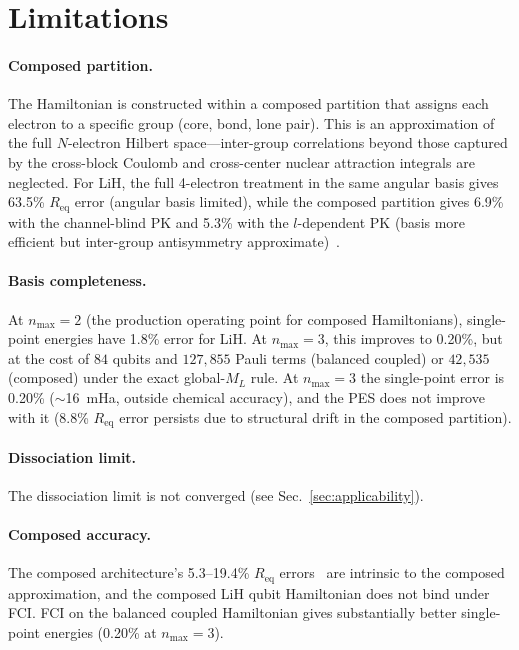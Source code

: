 \documentclass[twocolumn,pra,amsmath,amssymb,superscriptaddress]{revtex4-2}
\begin{document}
\section{Limitations}
\label{sec:limitations}

\paragraph{Composed partition.}
The Hamiltonian is constructed within a composed partition that assigns
each electron to a specific group (core, bond, lone pair).  This is
an approximation of the full $N$-electron Hilbert space---inter-group
correlations beyond those captured by the cross-block Coulomb and
cross-center nuclear attraction integrals are neglected.  For LiH,
the full 4-electron treatment in the same angular basis gives 63.5\%
$R_{\text{eq}}$ error (angular basis limited), while the composed
partition gives 6.9\% with the channel-blind PK and 5.3\% with the
$l$-dependent PK (basis more efficient but inter-group
antisymmetry approximate)~\cite{GeoVac_Paper17}.

\paragraph{Basis completeness.}
At $n_{\max}=2$ (the production operating point for composed
Hamiltonians), single-point energies have 1.8\% error for LiH.
At $n_{\max}=3$, this improves to 0.20\%, but at the cost of
$84$ qubits and $127{,}855$ Pauli terms (balanced coupled) or
$42{,}535$ (composed) under the exact global-$M_L$ rule.  At
$n_{\max}=3$ the single-point error is 0.20\% ($\sim$16~mHa, outside
chemical accuracy), and the PES does not improve with it
(8.8\% $R_{\text{eq}}$ error persists
due to structural drift in the composed partition).

\paragraph{Dissociation limit.}
The dissociation limit is not converged (see Sec.~\ref{sec:applicability}).

\paragraph{Composed accuracy.}
The composed architecture's 5.3--19.4\% $R_{\text{eq}}$
errors~\cite{GeoVac_Paper17} are intrinsic to the composed
approximation, and the composed LiH qubit Hamiltonian does not bind
under FCI.  FCI on the balanced coupled Hamiltonian gives substantially
better single-point energies (0.20\% at $n_{\max}=3$).
\end{document}
